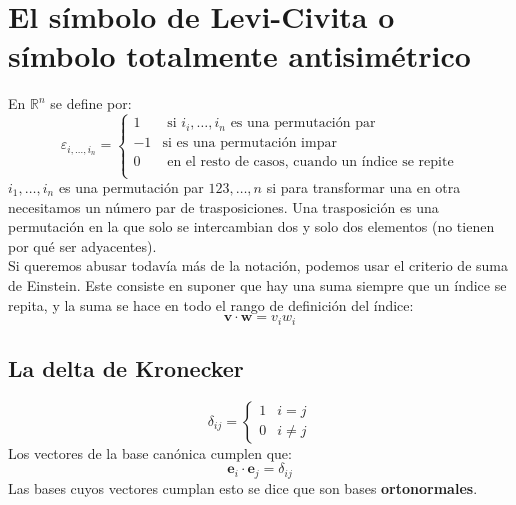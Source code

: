 \documentclass{../Calculo.tex}
\begin{document}
\section{El símbolo de Levi-Civita o símbolo totalmente antisimétrico}
En $\mathbb{R}^n$ se define por:
$$
\varepsilon_{i, \dots, i_{n}}=  \left\{\begin{matrix}
1 &\text{ si } i_{i},\dots,i_{n}\text{ es una permutación par} \\
-1 &\text{si es una permutación impar}  \\
0 &\text{ en el resto de casos, cuando un índice se repite}  \\
\end{matrix}\right.
$$
$i_{1},\dots,i_{n}$ es una permutación par $123,\dots,n$ si para transformar una en otra necesitamos un número par de trasposiciones. Una trasposición es una permutación en la que solo se intercambian dos y solo dos elementos (no tienen por qué ser adyacentes).\\
Si queremos abusar todavía más de la notación, podemos usar el criterio de suma de Einstein. Este consiste en suponer que hay una suma siempre que un índice se repita, y la suma se hace en todo el rango de definición del índice:
$$
\mathbf{v} \cdot \mathbf{w} = v_{i} w_{i}
$$
\subsection{La delta de Kronecker}
$$
\delta_{ij}=  \left\{\begin{matrix}
1 & i=j \\
0 & i\neq j
\end{matrix}\right.
$$
Los vectores de la base canónica cumplen que:
$$
\mathbf{e}_{i}\cdot \mathbf{e}_{j}=\delta_{ij}
$$
Las bases cuyos vectores cumplan esto se dice que son bases \textbf{ortonormales}.
\end{document}
